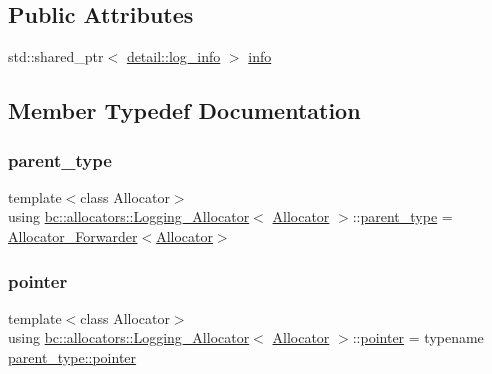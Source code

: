 \subsection*{Public Attributes}
\begin{DoxyCompactItemize}
\item 
std\+::shared\+\_\+ptr$<$ \hyperlink{structbc_1_1allocators_1_1detail_1_1log__info}{detail\+::log\+\_\+info} $>$ \hyperlink{structbc_1_1allocators_1_1Logging__Allocator_ab32f18018ee9b63af924090cbcc949bc}{info}
\end{DoxyCompactItemize}


\subsection{Member Typedef Documentation}
\mbox{\label{structbc_1_1allocators_1_1Logging__Allocator_a0ba4413e3f0e6957cd5806ae59511d38}} 
\subsubsection{\texorpdfstring{parent\+\_\+type}{parent\_type}}
{\footnotesize\ttfamily template$<$class Allocator$>$ \\
using \hyperlink{structbc_1_1allocators_1_1Logging__Allocator}{bc\+::allocators\+::\+Logging\+\_\+\+Allocator}$<$ \hyperlink{classbc_1_1allocators_1_1Allocator}{Allocator} $>$\+::\hyperlink{structbc_1_1allocators_1_1Logging__Allocator_a0ba4413e3f0e6957cd5806ae59511d38}{parent\+\_\+type} =  \hyperlink{structbc_1_1allocators_1_1Allocator__Forwarder}{Allocator\+\_\+\+Forwarder}$<$\hyperlink{classbc_1_1allocators_1_1Allocator}{Allocator}$>$}

\mbox{\label{structbc_1_1allocators_1_1Logging__Allocator_abde1034a802fbcbac68098d8406b490f}} 
\subsubsection{\texorpdfstring{pointer}{pointer}}
{\footnotesize\ttfamily template$<$class Allocator$>$ \\
using \hyperlink{structbc_1_1allocators_1_1Logging__Allocator}{bc\+::allocators\+::\+Logging\+\_\+\+Allocator}$<$ \hyperlink{classbc_1_1allocators_1_1Allocator}{Allocator} $>$\+::\hyperlink{structbc_1_1allocators_1_1Allocator__Forwarder_ae9d48fbeb22a6686ad59128cf309d8bd}{pointer} =  typename \hyperlink{structbc_1_1allocators_1_1Allocator__Forwarder_ae9d48fbeb22a6686ad59128cf309d8bd}{parent\+\_\+type\+::pointer}}

